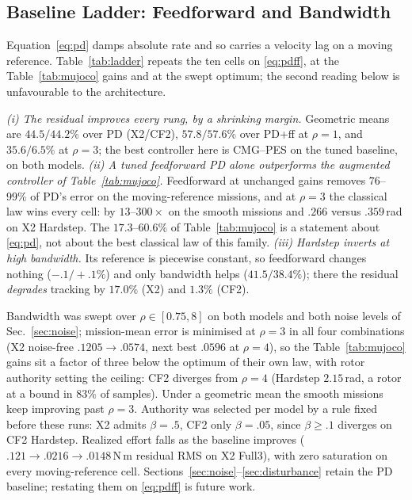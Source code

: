 \documentclass[letterpaper, 10 pt, conference]{ieeeconf}
\begin{document}
\subsection{Baseline Ladder: Feedforward and Bandwidth}
\label{sec:ladder}
Equation~\eqref{eq:pd} damps absolute rate and so carries a velocity lag on
a moving reference. Table~\ref{tab:ladder} repeats the ten cells on
\eqref{eq:pdff}, at the Table~\ref{tab:mujoco} gains and at the swept
optimum; the second reading below is unfavourable to the architecture.

\emph{(i) The residual improves every rung, by a shrinking margin.}
Geometric means are $44.5/44.2\%$ over PD (X2/CF2), $57.8/57.6\%$ over
PD+ff at $\rho=1$, and $35.6/6.5\%$ at $\rho=3$; the best controller here is
CMG--PES on the tuned baseline, on both models.
\emph{(ii) A tuned feedforward PD alone outperforms the augmented
controller of Table~\ref{tab:mujoco}.} Feedforward at unchanged gains
removes $76$--$99\%$ of PD's error on the moving-reference missions, and at
$\rho=3$ the classical law wins every cell: by $13$--$300\times$ on the
smooth missions and $.266$ versus $.359$\,rad on X2 Hardstep. The
$17.3$--$60.6\%$ of Table~\ref{tab:mujoco} is a statement about
\eqref{eq:pd}, not about the best classical law of this family.
\emph{(iii) Hardstep inverts at high bandwidth.} Its reference is piecewise
constant, so feedforward changes nothing ($-.1/+.1\%$) and only bandwidth
helps ($41.5/38.4\%$); there the residual \emph{degrades} tracking by
$17.0\%$ (X2) and $1.3\%$ (CF2).

Bandwidth was swept over $\rho\in[0.75,8]$ on both models and both noise
levels of Sec.~\ref{sec:noise}; mission-mean error is minimised at $\rho=3$
in all four combinations (X2 noise-free $.1205\to.0574$, next best $.0596$
at $\rho=4$), so the Table~\ref{tab:mujoco} gains sit a factor of three
below the optimum of their own law, with rotor authority setting the
ceiling: CF2 diverges from $\rho=4$ (Hardstep $2.15$\,rad, a rotor at a
bound in $83\%$ of samples). Under a geometric mean the smooth missions keep
improving past $\rho=3$.
Authority was selected per model by a rule fixed before these runs: X2
admits $\beta=.5$, CF2 only $\beta=.05$, since $\beta\ge.1$ diverges on CF2
Hardstep. Realized effort falls as the baseline improves ($.121\to.0216\to
.0148$\,N\,m residual RMS on X2 Full3), with zero saturation on every
moving-reference cell. Sections~\ref{sec:noise}--\ref{sec:disturbance}
retain the PD baseline; restating them on \eqref{eq:pdff} is future work.
\end{document}
